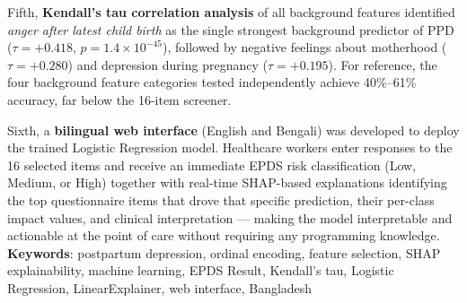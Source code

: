 Fifth, \textbf{Kendall's tau correlation analysis} of all background features identified \textit{anger after latest child birth} as the single strongest background predictor of PPD ($\tau = +0.418$, $p = 1.4 \times 10^{-45}$), followed by negative feelings about motherhood ($\tau = +0.280$) and depression during pregnancy ($\tau = +0.195$).
For reference, the four background feature categories tested independently achieve 40\%--61\% accuracy, far below the 16-item screener.

Sixth, a \textbf{bilingual web interface} (English and Bengali) was developed to deploy the trained Logistic Regression model.
Healthcare workers enter responses to the 16 selected items and receive an immediate EPDS risk classification (Low, Medium, or High) together with real-time SHAP-based explanations identifying the top questionnaire items that drove that specific prediction, their per-class impact values, and clinical interpretation --- making the model interpretable and actionable at the point of care without requiring any programming knowledge.
\vspace{\baselineskip}
\noindent
\textbf{Keywords}: postpartum depression, ordinal encoding, feature selection, SHAP explainability, machine learning, EPDS Result, Kendall's tau, Logistic Regression, LinearExplainer, web interface, Bangladesh
